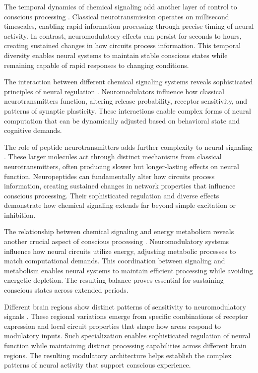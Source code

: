 The temporal dynamics of chemical signaling add another layer of control to conscious processing \cite{Palacios-Filardo2019}. Classical neurotransmission operates on millisecond timescales, enabling rapid information processing through precise timing of neural activity. In contrast, neuromodulatory effects can persist for seconds to hours, creating sustained changes in how circuits process information. This temporal diversity enables neural systems to maintain stable conscious states while remaining capable of rapid responses to changing conditions.

The interaction between different chemical signaling systems reveals sophisticated principles of neural regulation \cite{Dayan2012}. Neuromodulators influence how classical neurotransmitters function, altering release probability, receptor sensitivity, and patterns of synaptic plasticity. These interactions enable complex forms of neural computation that can be dynamically adjusted based on behavioral state and cognitive demands.

The role of peptide neurotransmitters adds further complexity to neural signaling \cite{Nadim2014}. These larger molecules act through distinct mechanisms from classical neurotransmitters, often producing slower but longer-lasting effects on neural function. Neuropeptides can fundamentally alter how circuits process information, creating sustained changes in network properties that influence conscious processing. Their sophisticated regulation and diverse effects demonstrate how chemical signaling extends far beyond simple excitation or inhibition.

The relationship between chemical signaling and energy metabolism reveals another crucial aspect of conscious processing \cite{Marder2012}. Neuromodulatory systems influence how neural circuits utilize energy, adjusting metabolic processes to match computational demands. This coordination between signaling and metabolism enables neural systems to maintain efficient processing while avoiding energetic depletion. The resulting balance proves essential for sustaining conscious states across extended periods.

Different brain regions show distinct patterns of sensitivity to neuromodulatory signals \cite{Parr2017}. These regional variations emerge from specific combinations of receptor expression and local circuit properties that shape how areas respond to modulatory inputs. Such specialization enables sophisticated regulation of neural function while maintaining distinct processing capabilities across different brain regions. The resulting modulatory architecture helps establish the complex patterns of neural activity that support conscious experience.


